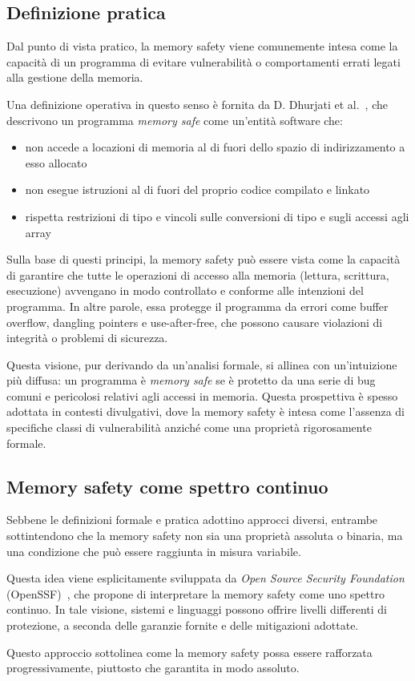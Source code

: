 \subsection{Definizione pratica}
\label{sec:practical_definition}

Dal punto di vista pratico, la memory safety viene comunemente intesa come la
capacità di un programma di evitare vulnerabilità o comportamenti errati legati
alla gestione della memoria.

Una definizione operativa in questo senso è fornita da D. Dhurjati et al.~\cite{memory_safety_without_runtime_checks},
che descrivono un programma \textit{memory safe} come un'entità software che:
\begin{itemize}
  \item non accede a locazioni di memoria al di fuori dello spazio di indirizzamento
    a esso allocato

  \item non esegue istruzioni al di fuori del proprio codice compilato e linkato

  \item rispetta restrizioni di tipo e vincoli sulle conversioni di tipo e sugli
    accessi agli array
\end{itemize}

Sulla base di questi principi, la memory safety può essere vista come la
capacità di garantire che tutte le operazioni di accesso alla memoria (lettura,
scrittura, esecuzione) avvengano in modo controllato e conforme alle intenzioni
del programma. In altre parole, essa protegge il programma da errori come buffer
overflow, dangling pointers e use-after-free, che possono causare violazioni di
integrità o problemi di sicurezza.

Questa visione, pur derivando da un'analisi formale, si allinea con un'intuizione
più diffusa: un programma è \textit{memory safe} se è protetto da una serie di
bug comuni e pericolosi relativi agli accessi in memoria. Questa prospettiva è spesso
adottata in contesti divulgativi, dove la memory safety è intesa come
l'assenza di specifiche classi di vulnerabilità anziché come una proprietà
rigorosamente formale.

\subsection{Memory safety come spettro continuo}
\label{sec:continuum_definition}

Sebbene le definizioni formale e pratica adottino approcci diversi, entrambe
sottintendono che la memory safety non sia una proprietà assoluta o binaria, ma una
condizione che può essere raggiunta in misura variabile.

Questa idea viene esplicitamente sviluppata da \textit{Open Source Security
Foundation} (OpenSSF)~\cite{memory_safety_continuum}, che propone di interpretare
la memory safety come uno spettro continuo. In tale visione, sistemi e linguaggi
possono offrire livelli differenti di protezione, a seconda delle garanzie
fornite e delle mitigazioni adottate.

Questo approccio sottolinea come la memory safety possa essere rafforzata
progressivamente, piuttosto che garantita in modo assoluto.
